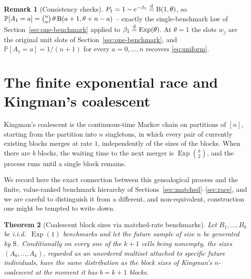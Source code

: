 \documentclass[11pt]{article}
\newcommand{\PP}{\mathbb{P}}
\DeclareMathOperator{\Exp}{Exp}
\theoremstyle{plain}
\newtheorem{theorem}{Theorem}[section]
\theoremstyle{definition}
\newtheorem{remark}[theorem]{Remark}
\begin{document}
\begin{remark}[Consistency checks]
\label{rem:esf-check}
\(P_1=1-e^{-\beta_1}\stackrel{\rm d}{=}{\rm B}(1,\theta)\), so \(\PP[A_1=a]=\binom na\,\theta\,{\rm B}(a+1,\theta+n-a)\) -- exactly the single-benchmark law of Section~\ref{sec:one-benchmark} applied to \(\beta_1\stackrel{\rm d}{=}\Exp(\theta)\). At \(\theta=1\) the slots \(w_j\) are the original unit slots of Section~\ref{sec:one-benchmark}, and \(\PP[A_1=a]=1/(n+1)\) for every \(a=0,\dots,n\) recovers \eqref{eq:uniform}.
\end{remark}

\section{The finite exponential race and Kingman's coalescent}
\label{sec:coalescent}

Kingman's coalescent \cite{Kingman1982} is the continuous-time Markov chain on partitions of \([n]\), starting from the partition into \(n\) singletons, in which every pair of currently existing blocks merges at rate \(1\), independently of the sizes of the blocks. When there are \(b\) blocks, the waiting time to the next merger is \(\Exp\binom{b}{2}\), and the process runs until a single block remains.

We record here the exact connection between this genealogical process and the finite, value-ranked benchmark hierarchy of Sections~\ref{sec:matched}--\ref{sec:race}, and we are careful to distinguish it from a different, and non-equivalent, construction one might be tempted to write down.

\begin{theorem}[Coalescent block sizes via matched-rate benchmarks]
\label{prop:coalescent-blocks}
Let \(B_1,\dots,B_k\) be i.i.d.\ \(\Exp(1)\) benchmarks and let the future sample of size \(n\) be generated by \({\rm S}\). Conditionally on every one of the \(k+1\) cells being nonempty, the sizes \((A_0,\dots,A_k)\), regarded as an unordered multiset attached to specific future individuals, have  the same distribution as the block sizes of Kingman's \(n\)-coalescent at the moment it has \(b=k+1\) blocks.
\end{theorem}
\end{document}
